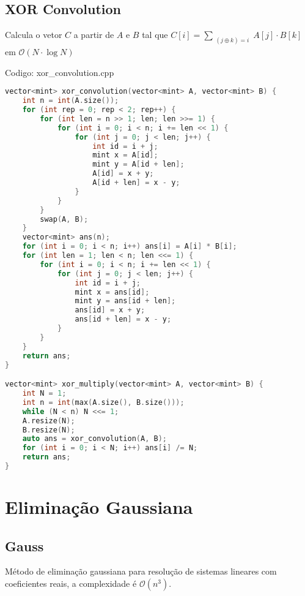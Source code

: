 \documentclass[10pt, a4paper, oneside]{book}
\begin{document}
\subsection{XOR Convolution}


Calcula o vetor $C$ a partir de $A$ e $B$ tal que $C[i] = \sum_{\substack{(j \oplus k) = i}} A[j] \cdot B[k]$ em $\mathcal{O}(N \cdot \log N)$

\hfill

Codigo: xor\_convolution.cpp

\begin{lstlisting}[language=C++]
vector<mint> xor_convolution(vector<mint> A, vector<mint> B) {
    int n = int(A.size());
    for (int rep = 0; rep < 2; rep++) {
        for (int len = n >> 1; len; len >>= 1) {
            for (int i = 0; i < n; i += len << 1) {
                for (int j = 0; j < len; j++) {
                    int id = i + j;
                    mint x = A[id];
                    mint y = A[id + len];
                    A[id] = x + y;
                    A[id + len] = x - y;
                }
            }
        }
        swap(A, B);
    }
    vector<mint> ans(n);
    for (int i = 0; i < n; i++) ans[i] = A[i] * B[i];
    for (int len = 1; len < n; len <<= 1) {
        for (int i = 0; i < n; i += len << 1) {
            for (int j = 0; j < len; j++) {
                int id = i + j;
                mint x = ans[id];
                mint y = ans[id + len];
                ans[id] = x + y;
                ans[id + len] = x - y;
            }
        }
    }
    return ans;
}

vector<mint> xor_multiply(vector<mint> A, vector<mint> B) {
    int N = 1;
    int n = int(max(A.size(), B.size()));
    while (N < n) N <<= 1;
    A.resize(N);
    B.resize(N);
    auto ans = xor_convolution(A, B);
    for (int i = 0; i < N; i++) ans[i] /= N;
    return ans;
}
\end{lstlisting}
\hfill

\section{Eliminação Gaussiana}
\subsection{Gauss}


Método de eliminação gaussiana para resolução de sistemas lineares com coeficientes reais, a complexidade é $\mathcal{O}(n^3)$.
\end{document}
